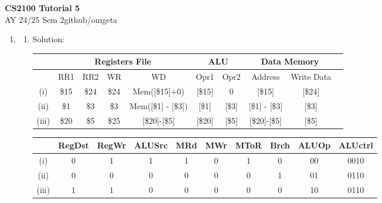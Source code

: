 \documentclass[12pt, a4paper]{article}
\newcommand{\mytitle}{CS2100 Tutorial 5}
\newcommand{\myauthor}{github/omgeta}
\newcommand{\mydate}{AY 24/25 Sem 2}
\begin{document}
\raggedright
\footnotesize
\begin{center}
{\normalsize{\textbf{\mytitle}}} \\
{\footnotesize{\mydate\hspace{2pt}\textemdash\hspace{2pt}\myauthor}}
\end{center}
\begin{enumerate}[Q\arabic*.]
  \item 
    \begin{enumerate}[(\alph*.)]
      \item Solution: 
        \begin{table}[h]
            \centering
            \begin{tabular}{|c|c|c|c|c|c|c|c|c|c|}
                \hline
                &\multicolumn{4}{|c|}{\textbf{Registers File}} & \multicolumn{2}{c|}{\textbf{ALU}} & \multicolumn{2}{c|}{\textbf{Data Memory}} \\
                \hline
                &RR1 & RR2 & WR & WD & Opr1 & Opr2 & Address & Write Data \\
                \hline
                (i)& \$15 & \$24 & \$24 & Mem([\$15]+0) & [\$15] & 0 & [\$15] & [\$24] \\
                \hline
                (ii)& \$1 & \$3 & \$3 & Mem([\$1] - [\$3])& [\$1]& [\$3]& [\$1] - [\$3]& [\$3]\\
                \hline
                (iii)& \$20& \$5& \$25& [\$20]-[\$5]& [\$20]& [\$5]& [\$20]-[\$5]& [\$5]\\
                \hline
            \end{tabular}
        \end{table}

        \begin{table}[h]
            \centering
            \begin{tabular}{|c|c|c|c|c|c|c|c|c|c|}
                \hline
                &\textbf{RegDst} & \textbf{RegWr} & \textbf{ALUSrc} & \textbf{MRd} & \textbf{MWr} & \textbf{MToR} & \textbf{Brch} & \textbf{ALUOp} & \textbf{ALUctrl} \\
                \hline
              (i)& 0 & 1 & 1 & 1 & 0 & 1 & 0 & 00 & 0010 \\
                \hline
              (ii)& 0& 0& 0& 0& 0& 0& 1& 01& 0110\\
                \hline
              (iii)& 1& 1& 0& 0& 0& 0& 0& 10& 0110\\
                \hline
            \end{tabular}
        \end{table}


\end{enumerate}
\end{enumerate}
\end{document}
